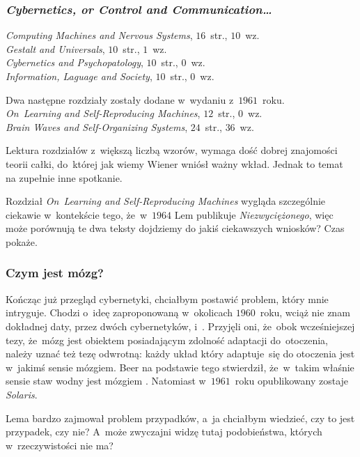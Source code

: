 \documentclass[10pt,t]{beamer}
\begin{document}
\begin{frame}
  \frametitle{\textit{Cybernetics, or Control and
      Communication\ldots}}


  \textit{Computing Machines and Nervous Systems}, $16$~str., $10$~wz. \\
  \textit{Gestalt and Universals}, $10$~str., $1$~wz. \\
  \textit{Cybernetics and Psychopatology}, $10$~str., $0$~wz. \\
  \textit{Information, Laguage and Society}, $10$~str., $0$~wz.

  Dwa następne rozdziały zostały dodane w~wydaniu z~$1961$~roku. \\
  \textit{On~Learning and Self-Reproducing Machines}, $12$~str., $0$~wz. \\
  \textit{Brain Waves and Self-Organizing Systems}, $24$~str., $36$~wz.

  Lektura rozdziałów z~większą liczbą wzorów, wymaga dość dobrej znajomości
  teorii całki, do~której jak wiemy Wiener wniósł ważny wkład. Jednak to
  temat na zupełnie inne spotkanie.

  Rozdział \textit{On~Learning and Self-Reproducing Machines} wygląda
  szczególnie ciekawie w~kontekście tego, że~w~$1964$ Lem publikuje
  \textit{Niezwyciężonego}, więc może porównują te dwa teksty dojdziemy
  do jakiś ciekawszych wniosków? Czas pokaże.

\end{frame}





\begin{frame}
  \frametitle{Czym jest mózg?}


  Kończąc już przegląd cybernetyki, chciałbym postawić problem, który mnie
  intryguje. Chodzi o~ideę zaproponowaną w~okolicach $1960$~roku, wciąż nie
  znam dokładnej daty, przez dwóch cybernetyków,
  i~.
  Przyjęli oni, że~obok wcześniejszej tezy, że~mózg jest obiektem
  posiadającym zdolność adaptacji do~otoczenia, należy uznać też tezę
  odwrotną: każdy układ który adaptuje~się do otoczenia jest w~jakimś
  sensie mózgiem. Beer na podstawie tego stwierdził, że~w~takim właśnie
  sensie staw wodny jest mózgiem
  \parencite{Pickering-Cybernetics-in-Britain-Ver-2022}. Natomiast
  w~$1961$~roku opublikowany zostaje \textit{Solaris}.

  Lema bardzo zajmował problem przypadków, a~ja chciałbym wiedzieć, czy to
  jest przypadek, czy nie? A~może zwyczajni widzę tutaj podobieństwa,
  których w~rzeczywistości nie ma?

\end{frame}
\end{document}

